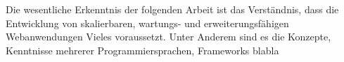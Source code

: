 
Die wesentliche Erkenntnis der folgenden Arbeit ist das Verständnis, dass die Entwicklung von skalierbaren, wartungs- und erweiterungsfähigen Webanwendungen Vieles voraussetzt. Unter Anderem sind es die Konzepte, Kenntnisse mehrerer Programmiersprachen, Frameworks blabla
